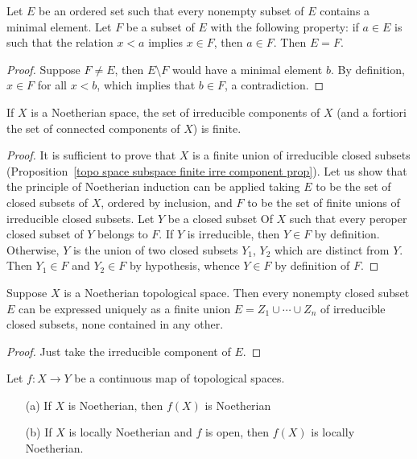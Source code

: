 \begin{lemma}\label{topo Noe induction principle}
Let $E$ be an ordered set such that every nonempty subset of $E$ contains a minimal element. Let $F$ be a subset of $E$ with the following property: if $a\in E$ is such that the relation $x<a$ implies $x\in F$, then $a\in F$. Then $E=F$.
\end{lemma}
\begin{proof}
Suppose $F\neq E$, then $E\setminus F$ would have a minimal element $b$. By definition, $x\in F$ for all $x<b$, which implies that $b\in F$, a contradiction.
\end{proof}
\begin{proposition}\label{topo space Noe finite irreducible componenet}
If $X$ is a Noetherian space, the set of irreducible components of $X$ (and a fortiori the set of connected components of $X$) is finite.
\end{proposition}
\begin{proof}
It is sufficient to prove that $X$ is a finite union of irreducible closed subsets (Proposition~\ref{topo space subspace finite irre component prop}). Let us show that the principle of Noetherian induction can be applied taking $E$ to be the set of closed subsets of $X$, ordered by inclusion, and $F$ to be the set of finite unions of irreducible closed subsets. Let $Y$ be a closed subset Of $X$ such that every peroper closed subset of $Y$ belongs to $F$. If $Y$ is irreducible, then $Y\in F$ by definition. Otherwise, $Y$ is the union of two closed subsets $Y_1$, $Y_2$ which are distinct from $Y$. Then $Y_1\in F$ and $Y_2\in F$ by hypothesis, whence $Y\in F$ by definition of $F$.
\end{proof}
\begin{proposition}\label{topo Noe irreducible decomp}
Suppose $X$ is a Noetherian topological space. Then every nonempty closed subset $E$ can be expressed uniquely as a finite union $E=Z_1\cup\cdots\cup Z_n$ of irreducible closed subsets, none contained in any other.
\end{proposition}
\begin{proof}
Just take the irreducible component of $E$.
\end{proof}
\begin{proposition}\label{topo space Noe under continuous map}
Let $f:X\to Y$ be a continuous map of topological spaces.
\begin{itemize}
\item[(a)] If $X$ is Noetherian, then $f(X)$ is Noetherian
\item[(b)] If $X$ is locally Noetherian and $f$ is open, then $f(X)$ is locally Noetherian.
\end{itemize}
\end{proposition}
